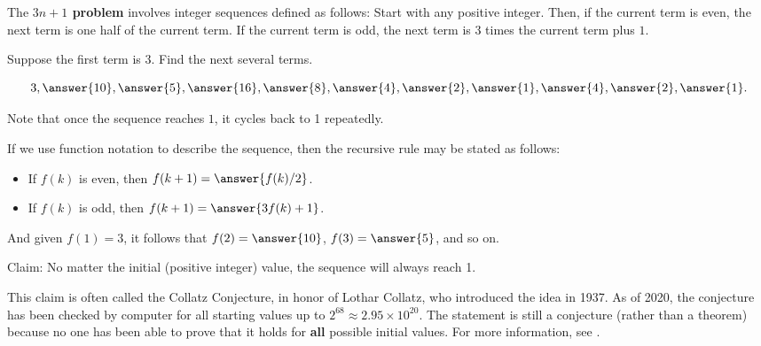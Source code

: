 \documentclass[nooutcomes]{ximera}
\begin{document}
\begin{problem}
The \textbf{$3n+1$ problem} involves integer sequences defined as follows:  Start with any positive integer. Then, if the current term is even, the next term is one half of the current term. If the current term is odd, the next term is $3$ times the current term plus $1$. 

Suppose the first term is 3.  Find the next several terms.  

\[
3, \answer{10}, \answer{5}, \answer{16}, \answer{8}, \answer{4}, \answer{2}, \answer{1}, \answer{4}, \answer{2}, \answer{1}.  
\]

Note that once the sequence reaches $1$, it cycles back to 1 repeatedly.  
\begin{problem}
If we use function notation to describe the sequence, then the recursive rule may be stated as follows: 

\begin{itemize}
\item If $f(k)$ is even, then $f(k+1) = \answer{f(k)/2}$. 
\item If $f(k)$ is odd, then $f(k+1) = \answer{3f(k) + 1}$.  
\end{itemize}

And given $f(1)=3$, it follows that $f(2)=\answer{10}$, $f(3)=\answer{5}$, and so on.  

Claim: No matter the initial (positive integer) value, the sequence will always reach 1.  

This claim is often called the Collatz Conjecture, in honor of Lothar Collatz, who introduced the idea in 1937.  As of 2020, the conjecture has been checked by computer for all starting values up to $2^{68} \approx 2.95\times 10^{20}$. The statement is still a conjecture (rather than a theorem) because no one has been able to prove that it holds for \textbf{all} possible initial values.  For more information, see . 

\end{problem}

\end{problem}
\end{document}
